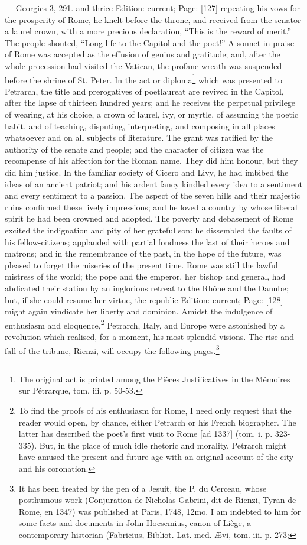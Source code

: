 {\texthebrew{—} Georgics 3, 291.} and thrice Edition: current; Page: [127] repeating his vows for the prosperity of Rome, he knelt before the throne, and received from the senator a laurel crown, with a more precious declaration, \texthebrew{“}This is the reward of merit.\texthebrew{}” The people shouted, \texthebrew{“}Long life to the Capitol and the poet!\texthebrew{}” A sonnet in praise of Rome was accepted as the effusion of genius and gratitude; and, after the whole procession had visited the Vatican, the profane wreath was suspended before the shrine of St. Peter. In the act or diploma\footnote{The original act is printed among the Pièces Justificatives in the Mémoires sur Pétrarque, tom. iii. p. 50-53.} which was presented to Petrarch, the title and prerogatives of poetlaureat are revived in the Capitol, after the lapse of thirteen hundred years; and he receives the perpetual privilege of wearing, at his choice, a crown of laurel, ivy, or myrtle, of assuming the poetic habit, and of teaching, disputing, interpreting, and composing in all places whatsoever and on all subjects of literature. The grant was ratified by the authority of the senate and people; and the character of citizen was the recompense of his affection for the Roman name. They did him honour, but they did him justice. In the familiar society of Cicero and Livy, he had imbibed the ideas of an ancient patriot; and his ardent fancy kindled every idea to a sentiment and every sentiment to a passion. The aspect of the seven hills and their majestic ruins confirmed these lively impressions; and he loved a country by whose liberal spirit he had been crowned and adopted. The poverty and debasement of Rome excited the indignation and pity of her grateful son: he dissembled the faults of his fellow-citizens; applauded with partial fondness the last of their heroes and matrons; and in the remembrance of the past, in the hope of the future, was pleased to forget the miseries of the present time. Rome was still the lawful mistress of the world; the pope and the emperor, her bishop and general, had abdicated their station by an inglorious retreat to the Rhône and the Danube; but, if she could resume her virtue, the republic Edition: current; Page: [128] might again vindicate her liberty and dominion. Amidst the indulgence of enthusiasm and eloquence,\footnote{To find the proofs of his enthusiasm for Rome, I need only request that the reader would open, by chance, either Petrarch or his French biographer. The latter has described the poet\texthebrew{}’s first visit to Rome [ad 1337] (tom. i. p. 323-335). But, in the place of much idle rhetoric and morality, Petrarch might have amused the present and future age with an original account of the city and his coronation.} Petrarch, Italy, and Europe were astonished by a revolution which realised, for a moment, his most splendid visions. The rise and fall of the tribune, Rienzi, will occupy the following pages.\footnote{It has been treated by the pen of a Jesuit, the P. du Cerceau, whose posthumous work (Conjuration de Nicholas Gabrini, dit de Rienzi, Tyran de Rome, en 1347) was published at Paris, 1748, 12mo. I am indebted to him for some facts and documents in John Hocsemius, canon of Liège, a contemporary historian (Fabricius, Bibliot. Lat. med. Ævi, tom. iii. p. 273; }
